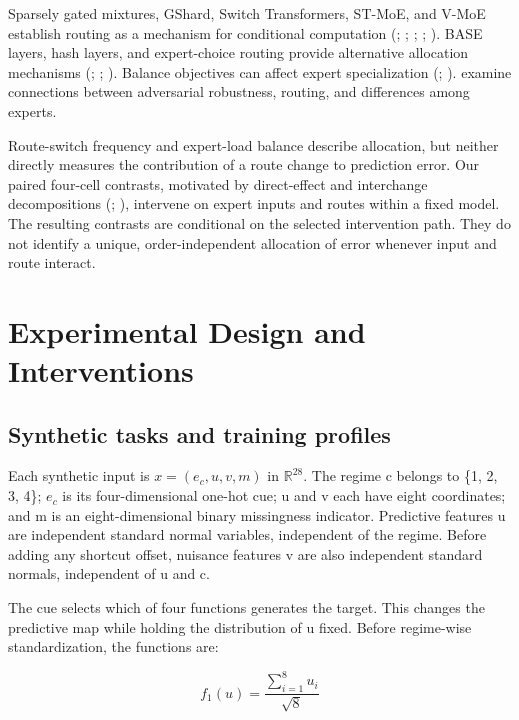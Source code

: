 \documentclass[10pt,letterpaper]{article}
\begin{document}
Sparsely gated mixtures, GShard, Switch Transformers, ST-MoE, and V-MoE establish routing as a mechanism for conditional computation (\citealp{shazeer2017}; \citealp{lepikhin2021}; \citealp{fedus2022}; \citealp{zoph2022}; \citealp{riquelme2021}). BASE layers, hash layers, and expert-choice routing provide alternative allocation mechanisms (\citealp{lewis2021}; \citealp{roller2021}; \citealp{zhou2022}). Balance objectives can affect expert specialization (\citealp{chen2022}; \citealp{qiu2025}). \citet{puigcerver2022} examine connections between adversarial robustness, routing, and differences among experts.


Route-switch frequency and expert-load balance describe allocation, but neither directly measures the contribution of a route change to prediction error. Our paired four-cell contrasts, motivated by direct-effect and interchange decompositions (\citealp{pearl2001}; \citealp{geiger2021}), intervene on expert inputs and routes within a fixed model. The resulting contrasts are conditional on the selected intervention path. They do not identify a unique, order-independent allocation of error whenever input and route interact.


\FloatBarrier

\section{Experimental Design and Interventions}

\subsection{Synthetic tasks and training profiles}

Each synthetic input is $x=(e_c,u,v,m)$ in $\mathbb R^{28}$. The regime c belongs to \{1, 2, 3, 4\}; $e_{c}$ is its four-dimensional one-hot cue; u and v each have eight coordinates; and m is an eight-dimensional binary missingness indicator. Predictive features u are independent standard normal variables, independent of the regime. Before adding any shortcut offset, nuisance features v are also independent standard normals, independent of u and c.


The cue selects which of four functions generates the target. This changes the predictive map while holding the distribution of u fixed. Before regime-wise standardization, the functions are:


\[
f_1(u)=\frac{\sum_{i=1}^{8}u_i}{\sqrt{8}}
\]
\end{document}
